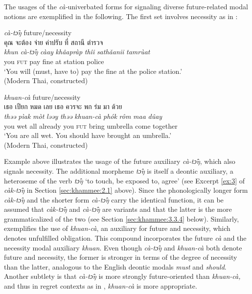 \documentclass[output=paper,colorlinks,citecolor=brown]{langscibook}
\begin{document}
The usages of the \textit{cà}\textit{-}univerbated forms for signaling diverse future-related modal notions are exemplified in the following. The first set involves necessity as in : 

\ea \label{ex:6} 
    \ea \label{ex:6a} \textit{cà-tɔ̂ŋ} future/necessity\\
        \textthai{คุณ} \textthai{จะต้อง} \textthai{จ่าย} \textthai{ค่าปรับ} \textthai{ที่} \textthai{สถานี} \textthai{ตำรวจ}\\
        \gll \textit{khun} \textit{cà-tɔ̂ŋ} \textit{càay} \textit{khâapràp} \textit{thîi} \textit{sathǎanii} \textit{tamrùat}\\
        you \textsc{fut} pay fine at station police\\
        \glt ‘You will (must, have to) pay the fine at the police station.’ \\
        \hfill (Modern Thai, constructed)

    \ex \label{ex:6b} \textit{khuan-cà} future/necessity\\
        \textthai{เธอ} \textthai{เปียก} \textthai{หมด} \textthai{เลย} \textthai{เธอ} \textthai{ควรจะ} \textthai{พก} \textthai{ร่ม} \textthai{มา} \textthai{ด้วย}\\
        \gll \textit{thəə} \textit{pìak} \textit{mòt} \textit{ləəy} \textit{thəə} \textit{khuan-cà} \textit{phók} \textit{rôm} \textit{maa} \textit{dûay}\\
        you wet all already you \textsc{fut} bring umbrella come together\\
        \glt ‘You are all wet. You should have brought an umbrella.’ \\
        \hfill (Modern Thai, constructed)
    \z
\z


Example  above illustrates the usage of the future auxiliary \textit{cà-tɔ̂ŋ}, which also signals necessity. The additional morpheme \textit{tɔ̂ŋ} is itself a deontic auxiliary, a heteroseme of the verb \textit{tɔ̂ŋ} ‘to touch, be exposed to, agree’ (see Excerpt \ref{ex:3} of \textit{càk-tɔ̂ŋ} in Section \ref{sec:khammee:2.1} above). Since the phonologically longer form \textit{càk-tɔ̂ŋ} and the shorter form \textit{cà-tɔ̂ŋ} carry the identical function, it can be assumed that \textit{càk-tɔ̂ŋ} and \textit{cà-tɔ̂ŋ} are variants and that the latter is the more grammaticalized of the two (see Section \ref{sec:khammee:3.3.4} below). Similarly,  exemplifies the use of \textit{khuan-cà}, an auxiliary for future and necessity, which denotes unfulfilled obligation. This compound incorporates the future \textit{cà} and the necessity modal auxiliary \textit{khuan}. Even though \textit{cà-tɔ̂ŋ} and \textit{khuan-cà} both denote future and necessity, the former is stronger in terms of the degree of necessity than the latter, analogous to the English deontic modals \textit{must} and \textit{should}. Another subtlety is that \textit{cà-tɔ̂ŋ} is more strongly future-oriented than \textit{khuan-cà}\textit{,} and thus in regret contexts as in , \textit{khuan-cà} is more appropriate. 
\end{document}
